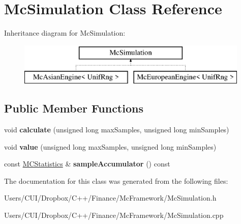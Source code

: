 \hypertarget{class_mc_simulation}{}\section{Mc\+Simulation Class Reference}
\label{class_mc_simulation}
Inheritance diagram for Mc\+Simulation\+:\begin{figure}[H]
\begin{center}
\leavevmode
\includegraphics[height=2.000000cm]{class_mc_simulation}
\end{center}
\end{figure}
\subsection*{Public Member Functions}
\begin{DoxyCompactItemize}
\item 
\hypertarget{class_mc_simulation_a34949008df3c2b7fd4df32fac3875582}{}\label{class_mc_simulation_a34949008df3c2b7fd4df32fac3875582} 
void {\bfseries calculate} (unsigned long max\+Samples, unsigned long min\+Samples)
\item 
\hypertarget{class_mc_simulation_a5f74044189f64941f7fd3aaa4acc8e8e}{}\label{class_mc_simulation_a5f74044189f64941f7fd3aaa4acc8e8e} 
void {\bfseries value} (unsigned long max\+Samples, unsigned long min\+Samples)
\item 
\hypertarget{class_mc_simulation_af66197576bd23e26e91636f8ca1c7197}{}\label{class_mc_simulation_af66197576bd23e26e91636f8ca1c7197} 
const \hyperlink{class_m_c_statistics}{M\+C\+Statistics} \& {\bfseries sample\+Accumulator} () const
\end{DoxyCompactItemize}


The documentation for this class was generated from the following files\+:\begin{DoxyCompactItemize}
\item 
Users/\+C\+U\+I/\+Dropbox/\+C++/\+Finance/\+Mc\+Framework/Mc\+Simulation.\+h\item 
Users/\+C\+U\+I/\+Dropbox/\+C++/\+Finance/\+Mc\+Framework/Mc\+Simulation.\+cpp\end{DoxyCompactItemize}
